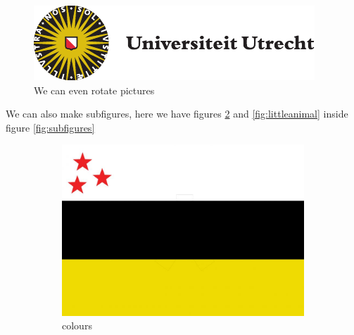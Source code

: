 \documentclass[thesis]{subfiles}
\begin{document}
\begin{figure}[b!]
    \includegraphics[scale = 0.9, angle = 31.4159]{uulogo.pdf}
    \caption{We can even rotate pictures}
    \label{fig:asbak}
\end{figure}
\clearpage

We can also make subfigures, here we have figures \ref{fig:coulors} and \ref{fig:littleanimal} inside figure \ref{fig:subfigures}
\begin{figure}
	\begin{subfigure}[b]
		{0.45\textwidth}
		\centering
		\includegraphics[width=\linewidth]{ibavlag.jpg}
		\caption{colours}
		\label{fig:coulors}
	\end{subfigure}
	\begin{subfigure}[b]
		{0.45\textwidth}
		\centering

\end{subfigure}
\end{figure}
\end{document}
